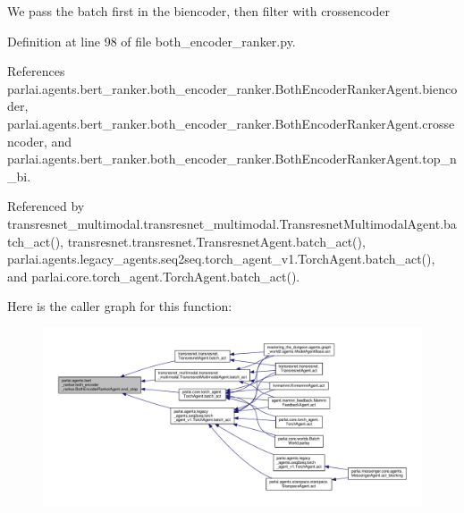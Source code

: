 \begin{DoxyVerb}We pass the batch first in the biencoder, then filter with crossencoder
\end{DoxyVerb}
 

Definition at line 98 of file both\+\_\+encoder\+\_\+ranker.\+py.



References parlai.\+agents.\+bert\+\_\+ranker.\+both\+\_\+encoder\+\_\+ranker.\+Both\+Encoder\+Ranker\+Agent.\+biencoder, parlai.\+agents.\+bert\+\_\+ranker.\+both\+\_\+encoder\+\_\+ranker.\+Both\+Encoder\+Ranker\+Agent.\+crossencoder, and parlai.\+agents.\+bert\+\_\+ranker.\+both\+\_\+encoder\+\_\+ranker.\+Both\+Encoder\+Ranker\+Agent.\+top\+\_\+n\+\_\+bi.



Referenced by transresnet\+\_\+multimodal.\+transresnet\+\_\+multimodal.\+Transresnet\+Multimodal\+Agent.\+batch\+\_\+act(), transresnet.\+transresnet.\+Transresnet\+Agent.\+batch\+\_\+act(), parlai.\+agents.\+legacy\+\_\+agents.\+seq2seq.\+torch\+\_\+agent\+\_\+v1.\+Torch\+Agent.\+batch\+\_\+act(), and parlai.\+core.\+torch\+\_\+agent.\+Torch\+Agent.\+batch\+\_\+act().

Here is the caller graph for this function\+:
\nopagebreak
\begin{figure}[H]
\begin{center}
\leavevmode
\includegraphics[width=350pt]{classparlai_1_1agents_1_1bert__ranker_1_1both__encoder__ranker_1_1BothEncoderRankerAgent_a6d189366af4a1264770d59e4b114967a_icgraph}
\end{center}
\end{figure}
\mbox{\label{classparlai_1_1agents_1_1bert__ranker_1_1both__encoder__ranker_1_1BothEncoderRankerAgent_a3900966ef98a770cf6e871bb7de67907}} 
